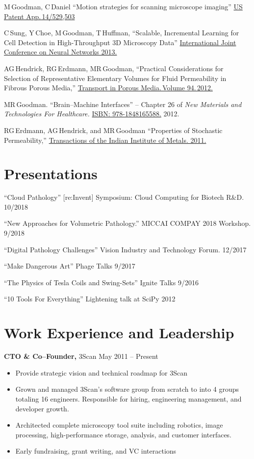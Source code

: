 \documentclass{res}
\begin{document}
\begin{resume}
  M\,Goodman, C\,Daniel
  ``Motion strategies for scanning microscope imaging''
  \href{https://patents.google.com/patent/US20150138532A1/en}{US Patent App.\,14/529,503}

  C\,Sung, Y\,Choe, M\,Goodman, T\,Huffman,
  ``Scalable, Incremental Learning for Cell Detection in High-Throughput 3D Microscopy Data''
  \href{https://doi.org/10.1109/IJCNN.2013.6706769}{International Joint Conference on Neural Networks 2013.}

  AG\,Hendrick, RG\,Erdmann, MR\,Goodman,
  ``Practical Considerations for Selection of Representative
  Elementary Volumes for Fluid Permeability in Fibrous Porous Media,''
  \href{http://dx.doi.org/10.1007/s11242-012-0051-8}{Transport in Porous Media.\,Volume 94.\,2012.}

  MR\,Goodman.
  ``Brain--Machine Interfaces'' -- Chapter 26 of \textit{New Materials and Technologies For Healthcare.}
  \href{http://amzn.com/1848165587}{ISBN: 978-1848165588.} 2012.

  RG\,Erdmann, AG\,Hendrick, and MR\,Goodman
  ``Properties of Stochastic Permeability,''
  \href{http://dx.doi.org/10.1007/s12666-009-0038-5}{Transactions of the Indian Institute of Metals. 2011.}

\section{Presentations}
  ``Cloud Pathology''
  [re:Invent] Symposium: Cloud Computing for Biotech R\&D.  10/2018

  ``New Approaches for Volumetric Pathology.''
  MICCAI COMPAY 2018 Workshop.  9/2018

  ``Digital Pathology Challenges''
  Vision Industry and Technology Forum.  12/2017

  ``Make Dangerous Art''
  Phage Talks 9/2017

  ``The Physics of Tesla Coils and Swing-Sets''
  Ignite Talks 9/2016

  ``10 Tools For Everything''
  Lightening talk at SciPy 2012

\section{Work Experience and Leadership}

{\bf CTO \& Co--Founder,} 3Scan \hfill
May 2011 -- Present
\begin{itemize}  \itemsep -2pt
  \item Provide strategic vision and technical roadmap for 3Scan
  \item Grown and managed 3Scan's software group from scratch to into 4 groups totaling 16 engineers.
    Responsible for hiring, engineering management, and developer growth.
  \item Architected complete microscopy tool suite including robotics, image processing,
    high-performance storage, analysis, and customer interfaces.
  \item Early fundraising, grant writing, and VC interactions
\end{itemize}


\end{resume}
\end{document}
